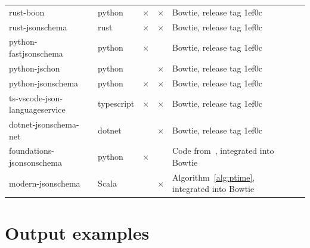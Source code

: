 \begin{toappendix}
\begin{table}[ht]
\begin{tabular}{llccll}
rust-boon & python &  $\times$ & $\times$ & Bowtie, release tag 1ef0c\\
%
rust-jsonschema & rust & $\times$ & $\times$ &  Bowtie, release tag 1ef0c\\
%
python-fastjsonschema & python & $\times$ & & Bowtie, release tag 1ef0c\\
%
python-jschon & python & &  $\times$  & Bowtie, release tag 1ef0c\\
%
python-jsonschema & python & $\times$ & $\times$ &  Bowtie, release tag 1ef0c\\
%
ts-vscode-json-languageservice& typescript & $\times$ & $\times$ &  Bowtie, release tag 1ef0c\\
%
dotnet-jsonschema-net & dotnet & & $\times$ & Bowtie, release tag 1ef0c\\
%
\midrule 
% 
foundations-jsonsonschema & python & $\times$ & & Code from~\citep{DBLP:conf/www/PezoaRSUV16}, integrated into Bowtie\\
%
modern-jsonschema & Scala & & $\times$ & Algorithm~\ref{alg:ptime}, integrated into Bowtie\\
%
%
\bottomrule
\end{tabular}

\end{table}

\newpage

\section{Output examples}\label{sec:figures}









%
%
%
%
%
%
%


%
%
%

\end{toappendix}







